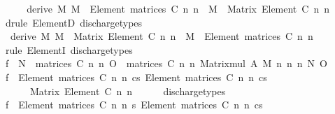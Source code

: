\begin{isabellebody}
%
\isadelimproof
%
\endisadelimproof
%
\isatagproof
{}\isamarkupfalse%
\ {\isacharminus}{\kern0pt}\isanewline
\ \ \isamarkupfalse%
\ {\isacharbrackleft}{\kern0pt}derive{\isacharbrackright}{\kern0pt}{\isacharcolon}{\kern0pt}\ {\isachardoublequoteopen}{\isasymAnd}M{\isachardot}{\kern0pt}\ M\ {\isacharcolon}{\kern0pt}\ Element\ {\isacharparenleft}{\kern0pt}matrices\ C\ n\ n{\isacharparenright}{\kern0pt}\ {\isasymLongrightarrow}\ M\ {\isacharcolon}{\kern0pt}\ Matrix\ {\isacharparenleft}{\kern0pt}Element\ C{\isacharparenright}{\kern0pt}\ n\ n{\isachardoublequoteclose}\isanewline
\ \ \ \ \isamarkupfalse%
\ {\isacharparenleft}{\kern0pt}drule\ ElementD{\isacharparenright}{\kern0pt}\ discharge{\isacharunderscore}{\kern0pt}types\isanewline
\ \ \isamarkupfalse%
\ {}\ {\isacharbrackleft}{\kern0pt}derive{\isacharbrackright}{\kern0pt}{\isacharcolon}{\kern0pt}\ {\isachardoublequoteopen}{\isasymAnd}M{\isachardot}{\kern0pt}\ M\ {\isacharcolon}{\kern0pt}\ Matrix\ {\isacharparenleft}{\kern0pt}Element\ C{\isacharparenright}{\kern0pt}\ n\ n\ {\isasymLongrightarrow}\ M\ {\isacharcolon}{\kern0pt}\ Element\ {\isacharparenleft}{\kern0pt}matrices\ C\ n\ n{\isacharparenright}{\kern0pt}{\isachardoublequoteclose}\isanewline
\ \ \ \ \isamarkupfalse%
\ {\isacharparenleft}{\kern0pt}rule\ ElementI{\isacharparenright}{\kern0pt}\ discharge{\isacharunderscore}{\kern0pt}types\isanewline
\ \ \isamarkupfalse%
\ {\isacharquery}{\kern0pt}f\ {\isacharequal}{\kern0pt}\ {\isachardoublequoteopen}{\isasymlambda}N\ {\isasymin}\ matrices\ C\ n\ n{\isachardot}{\kern0pt}\ {\isacharparenleft}{\kern0pt}{\isasymlambda}O\ {\isasymin}\ matrices\ C\ n\ n{\isachardot}{\kern0pt}\ Matrix{\isacharunderscore}{\kern0pt}mul\ A\ M\ n\ n\ n\ N\ O{\isacharparenright}{\kern0pt}{\isachardoublequoteclose}\isanewline
\ \ \isamarkupfalse%
\ {\isachardoublequoteopen}{\isacharquery}{\kern0pt}f\ {\isacharcolon}{\kern0pt}\ Element\ {\isacharparenleft}{\kern0pt}matrices\ C\ n\ n{\isacharparenright}{\kern0pt}\ {\isasymrightarrow}cs\ Element\ {\isacharparenleft}{\kern0pt}matrices\ C\ n\ n{\isacharparenright}{\kern0pt}\ {\isasymrightarrow}cs\isanewline
\ \ \ \ \ \ Matrix\ {\isacharparenleft}{\kern0pt}Element\ C{\isacharparenright}{\kern0pt}\ n\ n{\isachardoublequoteclose}\isanewline
\ \ \ \ \isamarkupfalse%
\ discharge{\isacharunderscore}{\kern0pt}types\isanewline
\ \ \isamarkupfalse%
\ \isamarkupfalse%
\ {\isachardoublequoteopen}{\isacharquery}{\kern0pt}f\ {\isacharcolon}{\kern0pt}\ Element\ {\isacharparenleft}{\kern0pt}matrices\ C\ n\ n{\isacharparenright}{\kern0pt}\ {\isasymrightarrow}s\ Element\ {\isacharparenleft}{\kern0pt}matrices\ C\ n\ n{\isacharparenright}{\kern0pt}\ {\isasymrightarrow}cs\isanewline

\end{isabellebody}
